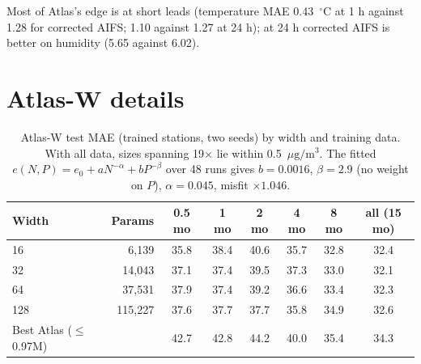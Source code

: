 \documentclass{article}
\newcommand{\pmu}{\ensuremath{\mu\mathrm{g/m^3}}}
\begin{document}
Most of Atlas's edge is at short leads (temperature MAE 0.43~$^\circ$C at 1 h against 1.28 for corrected AIFS;
1.10 against 1.27 at 24 h); at 24 h corrected AIFS is better on humidity (5.65 against 6.02).

\section{Atlas-W details}
\label{app:atlasw}

\begin{table}[H]
\caption{Atlas-W test MAE (trained stations, two seeds) by width and training data. With all data, sizes spanning
19$\times$ lie within 0.5~\pmu. The fitted $e(N,P)=e_0+aN^{-\alpha}+bP^{-\beta}$ over 48 runs gives $b=0.0016$,
$\beta=2.9$ (no weight on $P$), $\alpha=0.045$, misfit $\times1.046$.}
\centering\small
\begin{tabular}{lrcccccc}
\toprule
Width & Params & 0.5 mo & 1 mo & 2 mo & 4 mo & 8 mo & all (15 mo) \\
\midrule
16 & 6,139 & 35.8 & 38.4 & 40.6 & 35.7 & 32.8 & 32.4 \\
32 & 14,043 & 37.1 & 37.4 & 39.5 & 37.3 & 33.0 & 32.1 \\
64 & 37,531 & 37.9 & 37.4 & 39.2 & 36.6 & 33.4 & 32.3 \\
128 & 115,227 & 37.6 & 37.7 & 37.7 & 35.8 & 34.9 & 32.6 \\
\midrule
Best Atlas ($\le$0.97M) & & 42.7 & 42.8 & 44.2 & 40.0 & 35.4 & 34.3 \\
\bottomrule
\end{tabular}
\end{table}
\end{document}
